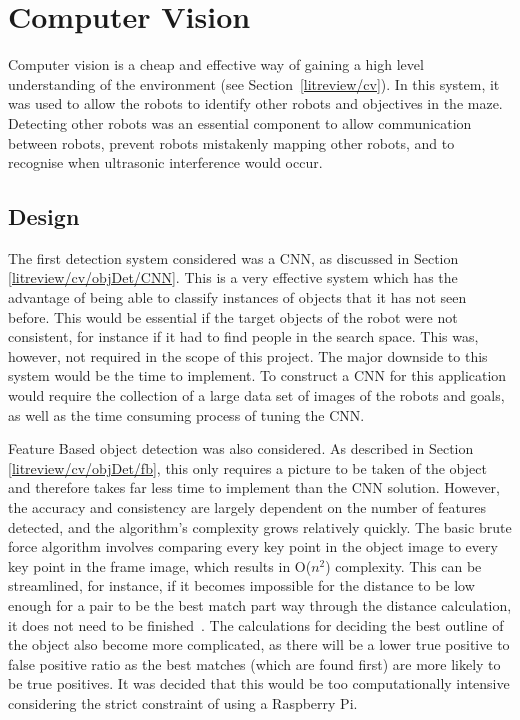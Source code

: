 \section{Computer Vision}\label{soft/cv}
Computer vision is a cheap and effective way of gaining a high level
understanding of the environment (see Section~\ref{litreview/cv}). In this system, it was used to allow the robots to
identify other robots and objectives in the maze. Detecting other
robots was an essential component to allow communication between robots,
prevent robots mistakenly mapping other robots, and to recognise when
ultrasonic interference would occur.

\subsection{Design}\label{soft/cv/design}
The first detection system considered was a CNN, as discussed in Section
\ref{litreview/cv/objDet/CNN}. This is a very effective system which has
the advantage of
being able to classify instances of objects that it has not
seen before. This would be essential if the target objects of
the robot were not consistent, for instance if it had to find
people in the search space. This was, however, not required
in the scope of this project. The major downside to this
system would be the time to implement. To construct a CNN for
this application would require the collection of a large data
set of images of the robots and goals, as well as the time
consuming process of tuning the CNN.

Feature Based object detection was also considered. As described in
Section \ref{litreview/cv/objDet/fb}, this only requires a picture to be
taken of the object and therefore takes far less time to
implement than the CNN solution. However, the accuracy and
consistency are largely dependent on the number of features
detected, and the algorithm's complexity grows relatively
quickly. The basic brute force algorithm involves comparing
every key point in the object image to every key point in the
frame image, which results in O($n^2$) complexity. This can be streamlined, for instance, if it becomes impossible
for the distance to be low enough for a pair to be the best
match part way through the distance calculation, it does not
need to be finished~\cite{opencv_library}. The calculations for deciding the best
outline of the object also become more complicated, as there
will be a lower true positive to false positive ratio as the
best matches (which are found first) are more likely to be
true positives. It was decided that this would be too
computationally intensive considering the strict constraint of
using a Raspberry Pi.

